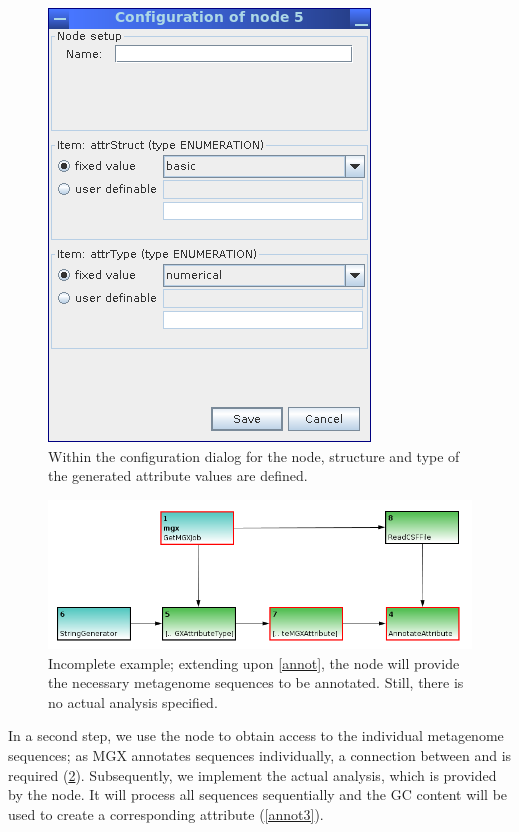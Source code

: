 \begin{figure}[H]
\centering
\includegraphics[width=.5\textwidth]{img/conveyor/createattrtype}
\caption[Defining an attribute type.]{Within the configuration dialog for the  node, structure and type of the generated attribute values are defined.}
\label{createattrtype}
\end{figure}

\begin{figure}[H]
\centering
\includegraphics[width=.8\textwidth]{img/conveyor/annotate_templ2}
\caption[Metagenome annotation]{Incomplete example; extending upon \ref{annot}, the  node will
provide the necessary metagenome sequences to be annotated. Still, there is no actual analysis specified.}
\label{annot2}
\end{figure}

In a second step, we use the  node to obtain access to the individual metagenome sequences; as 
MGX annotates sequences individually, a connection between  and  is
required (\ref{annot2}). Subsequently, we implement the actual analysis, which is provided by the 
node. It will process all sequences sequentially and the GC content will be used to create a corresponding
attribute (\ref{annot3}).

